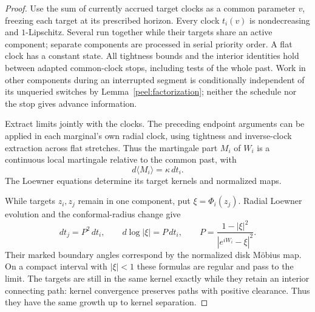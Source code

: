 \begin{proof}
Use the sum of currently accrued target clocks as a common parameter
$v$, freezing each target at its prescribed horizon.  Every clock
$t_i(v)$ is nondecreasing and $1$-Lipschitz.  Several run together while
their targets share an active component; separate components are
processed in serial priority order.  A flat clock has a constant state.
All tightness bounds and the interior identities hold between adapted
common-clock stops, including tests of the whole past.  Work in other
components during an interrupted segment is conditionally independent
of its unqueried switches by Lemma~\ref{peel:factorization}; neither
the schedule nor the stop gives advance information.

Extract limits jointly with the clocks.  The preceding endpoint
arguments can be applied in each marginal's own radial clock, using
tightness and inverse-clock extraction across flat stretches.  Thus
the martingale part $M_i$ of $W_i$ is a continuous local martingale
relative to the common past, with
\begin{equation}\label{tree:brackets}
 d\langle M_i\rangle=\kappa\,dt_i.
\end{equation}
The Loewner equations determine its target kernels and normalized
maps.

While targets $z_i,z_j$ remain in one component, put
$\xi=\Phi_i(z_j)$.  Radial Loewner evolution and the conformal-radius
change give
\begin{equation}\label{tree:clock-change}
 dt_j=P^2\,dt_i,\qquad
 d\log|\xi|=P\,dt_i,\qquad
 P=\frac{1-|\xi|^2}{|e^{iW_i}-\xi|^2}.
\end{equation}
Their marked boundary angles correspond by the normalized disk
M\"obius map.  On a compact interval with $|\xi|<1$ these formulas
are regular and pass to the limit.  The targets are still in the same
kernel exactly while they retain an interior connecting path: kernel
convergence preserves paths with positive clearance.  Thus they have
the same growth up to kernel separation.


\end{proof}
